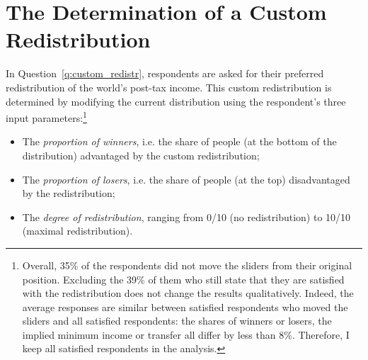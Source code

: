 \clearpage

\section*{The Determination of a Custom Redistribution}\label{app:algo}

In Question~\ref{q:custom_redistr}, respondents are asked for their preferred redistribution of the world's post-tax income. This custom redistribution is determined by modifying the current distribution using the respondent's three input parameters:\footnote{Overall, 35\% of the respondents did not move the sliders from their original position. Excluding the 39\% of them who still state that they are satisfied with the redistribution does not change the results qualitatively. Indeed, the average responses are similar between satisfied respondents who moved the sliders and all satisfied respondents: the shares of winners or losers, %
the implied minimum income or transfer %
all differ by less than 8\%. Therefore, I keep all satisfied respondents in the analysis. %
}
\begin{itemize}
    \item The \textit{proportion of winners}, i.e. the share of people (at the bottom of the distribution) advantaged by the custom redistribution;
    \item The \textit{proportion of losers}, i.e. the share of people (at the top) disadvantaged by the redistribution;
    \item The \textit{degree of redistribution}, ranging from 0/10 (no redistribution) to 10/10 (maximal redistribution).
\end{itemize}


